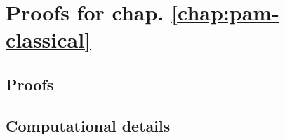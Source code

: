 \chapter{Proofs for chap. \ref{chap:pam-classical}}
\label{ap:a}
\section{Proofs}
\section{Computational details}
\label{ap:a-computational}
